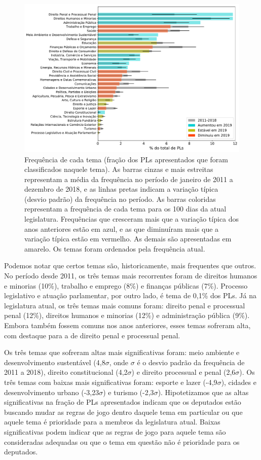 \documentclass[12pt,a4paper]{article}
\begin{document}
\begin{figure}[t]
\centering
\includegraphics[width=1.0\textwidth]{graficos/temas_PL_fracao2019-vs-mediaAnterior_2019-05-01.pdf}
\caption{Frequência de cada tema (fração dos PLs apresentados que foram classificados naquele tema).
  As barras cinzas e mais estreitas representam a média da frequência no período de janeiro de 2011 a
  dezembro de 2018, e as linhas pretas indicam a variação típica (desvio padrão) da frequência no período.
  As barras coloridas representam a frequência de cada tema para os 100 dias da atual legislatura.
  Frequências que cresceram mais que a variação típica dos anos anteriores estão em azul, e as que
  diminuíram mais que a variação típica estão em vermelho. As demais são apresentadas em amarelo.
  Os temas foram ordenados pela frequência atual.}
\label{fig:pl-por-tema}
\end{figure}

Podemos notar que certos temas são, historicamente, mais frequentes que outros. No período desde 2011,
os três temas mais recorrentes foram de direitos humanos e minorias (10\%), trabalho e emprego (8\%)
e finanças públicas (7\%). Processo legislativo e atuação parlamentar, por outro lado, é tema de 0,1\%
dos PLs. Já na legislatura atual, os três temas mais comuns foram: direito penal e processual penal (12\%),
direitos humanos e minorias (12\%) e administração pública (9\%). Embora também fossem comuns nos anos
anteriores, esses temas sofreram alta, com destaque para a de direito penal e processual penal.

Os três temas que sofreram altas mais significativas foram: meio ambiente e desenvolvimento
sustentável (4,8$\sigma$, onde $\sigma$ é o desvio padrão da frequência de 2011 a 2018),
direito constitucional (4,2$\sigma$) e direito processual e penal (2,6$\sigma$). Os três
temas com baixas mais significativas foram: esporte e lazer (-4,9$\sigma$), cidades e desenvolvimento
urbano (-3,23$\sigma$) e turismo (-2,3$\sigma$). Hipotetizamos que as altas significativas
na fração de PLs apresentados indicam que os deputados estão buscando mudar as regras de jogo dentro
daquele tema em particular ou que aquele tema é prioridade para a membros da legislatura atual.
Baixas significativas podem indicar que as regras de jogo para aquele
tema são consideradas adequadas ou que o tema em questão não é prioridade para os deputados.
\end{document}
